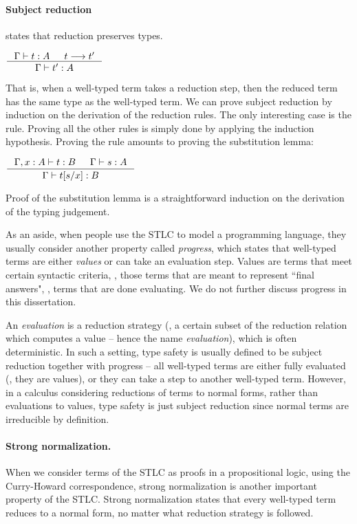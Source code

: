 \paragraph{Subject reduction}\hspace{-1em}
states that reduction preserves types.
\begin{theorem}
        $\inference{\Gamma |- t : A  & t --> t'}{\Gamma |- t' : A}$
\end{theorem}
That is, when a well-typed term takes a reduction step, then the reduced term
has the same type as the well-typed term. We can prove subject reduction
by induction on the derivation of the reduction rules.
The only interesting case is the  rule. Proving all
the other rules is simply done by applying the induction hypothesis.
Proving the  rule amounts to proving the substitution lemma:
\begin{lemma}[substitution]
$ \inference{\Gamma,x:A |- t : B  & \Gamma |- s : A}{\Gamma |- t[s/x] : B} $
\end{lemma}
Proof of the substitution lemma is a straightforward induction on
the derivation of the typing judgement.

As an aside, when people use the STLC to model a programming language,
they usually consider another property called \emph{progress},
which states that well-typed terms are either {\em values} or
can take an evaluation step. 
Values are terms that meet certain syntactic criteria, \ie, those terms
that are meant to represent ``final answers", \ie, terms that
are done evaluating. We do not further discuss progress in this dissertation.

An {\em evaluation} is a reduction strategy
(\ie, a certain subset of the reduction relation which computes a value --
hence the name {\em evaluation}), which is often deterministic.
In such a setting, type safety is usually defined to be subject reduction
together with progress -- all well-typed terms are either fully evaluated
(\ie, they are values), or they can take a step to another well-typed term.
However, in a calculus considering reductions of terms to normal forms,
rather than evaluations to values, type safety is just subject reduction
since normal terms are irreducible by definition.

\paragraph{Strong normalization.} 
When we consider terms of the STLC as proofs in a propositional logic,
using the Curry-Howard correspondence, strong normalization
is another important property of the STLC. Strong normalization states
that every well-typed term reduces to a normal form, no matter what
reduction strategy is followed.

